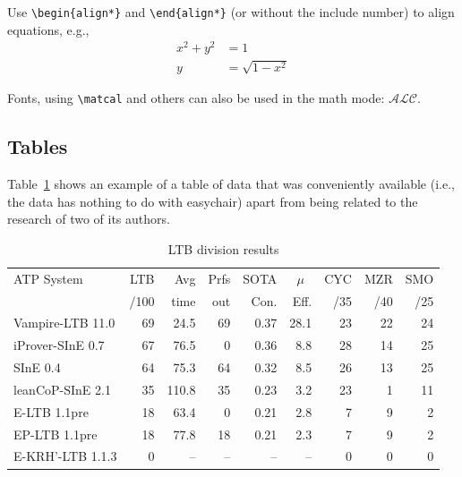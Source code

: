 \documentclass{easychair}
\newcommand{\easychair}{\textsf{easychair}}
\begin{document}
Use {\tt \verb|\|begin\{align*\}} and {\tt \verb|\|end\{align*\}} (or without
the {\tt *} include number) to align equations, e.g.,
\begin{align*}
x^2 + y^2 &= 1 \\
y &= \sqrt{1 - x^2}
\end{align*}

Fonts, using \verb|\matcal| and others can also be used in the math mode: $\mathcal{ALC}$.

\subsection{Tables}
\label{sect:tables}

Table~\ref{tab:ltbexample} shows an example of a table of data that was
conveniently available (i.e., the data has nothing to do with
{\easychair}) apart from being related to the research of two of its
authors. 

\begin{table}[htp]
	\begin{centering}
		\begin{tabular}{lrrrrrrrr}
		\hline
		ATP System            & LTB & Avg  &Prfs & SOTA & \multicolumn{1}{c}{$\mu$} & CYC & MZR & SMO \\
		                      & /100& time & out & Con. & Eff. & /35 & /40 & /25 \\
		\hline
		Vampire-LTB 11.0      &  69 & 24.5 &  69 & 0.37 & 28.1 &  23 &  22 &  24 \\
		iProver-SInE 0.7      &  67 & 76.5 &   0 & 0.36 &  8.8 &  28 &  14 &  25 \\
		SInE 0.4              &  64 & 75.3 &  64 & 0.32 &  8.5 &  26 &  13 &  25 \\
		leanCoP-SInE 2.1      &  35 &110.8 &  35 & 0.23 &  3.2 &  23 &   1 &  11 \\
		E-LTB 1.1pre          &  18 & 63.4 &   0 & 0.21 &  2.8 &   7 &   9 &   2 \\
		EP-LTB 1.1pre         &  18 & 77.8 &  18 & 0.21 &  2.3 &   7 &   9 &   2 \\
		E-KRH'-LTB 1.1.3      &   0 &   -- &  -- &   -- &   -- &   0 &   0 &   0 \\
		\hline
		\end{tabular}
		\caption{LTB division results}
		\label{tab:ltbexample}
	\end{centering}
\end{table}
\end{document}

